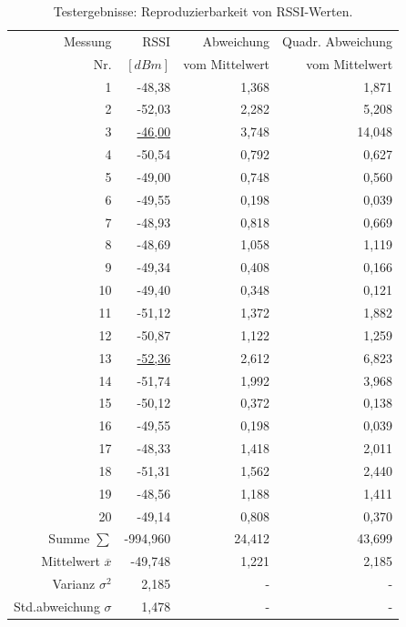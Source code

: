 \documentclass[10pt]{scrartcl}
\begin{document}
\begin{table}
\centering
\begin{tabular}{|r|r|r|r|}
\hline
Messung & RSSI & Abweichung & Quadr. Abweichung\\
Nr. & $[dBm]$ & vom Mittelwert & vom Mittelwert \\\hline
1 & -48,38 & 1,368 & 1,871 \\
2 & -52,03 & 2,282 & 5,208 \\
3 & \underline{-46,00} & 3,748 & 14,048 \\
4 & -50,54 & 0,792 & 0,627 \\
5 & -49,00 & 0,748 & 0,560 \\
6 & -49,55 & 0,198 & 0,039 \\
7 & -48,93 & 0,818 & 0,669 \\
8 & -48,69 & 1,058 & 1,119 \\
9 & -49,34 & 0,408 & 0,166 \\
10 & -49,40 & 0,348 & 0,121 \\
11 & -51,12 & 1,372 & 1,882 \\
12 & -50,87 & 1,122 & 1,259 \\
13 & \underline{-52,36} & 2,612 & 6,823 \\
14 & -51,74 & 1,992 & 3,968 \\
15 & -50,12 & 0,372 & 0,138 \\
16 & -49,55 & 0,198 & 0,039 \\
17 & -48,33 & 1,418 & 2,011 \\
18 & -51,31 & 1,562 & 2,440 \\
19 & -48,56 & 1,188 & 1,411 \\
20 & -49,14 & 0,808 & 0,370 \\\hline
Summe $\sum$ & -994,960 & 24,412 & 43,699 \\
Mittelwert $\overline{x}$ & -49,748 & 1,221 & 2,185 \\
Varianz $\sigma^2$ & 2,185 & - & - \\
Std.abweichung $\sigma$ & 1,478 & - & - \\
\hline
\end{tabular}
\caption{\label{tab:rssiReproduction}Testergebnisse: Reproduzierbarkeit von RSSI-Werten.}
\end{table}
\newpage
\end{document}
